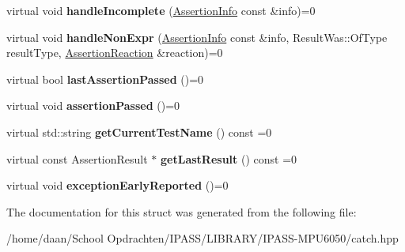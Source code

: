 \begin{DoxyCompactItemize}
\item 
\mbox{\label{structCatch_1_1IResultCapture_a89b89372eb09cc44f8dcad363de6157d}} 
virtual void {\bfseries handle\+Incomplete} (\hyperlink{structCatch_1_1AssertionInfo}{Assertion\+Info} const \&info)=0
\item 
\mbox{\label{structCatch_1_1IResultCapture_ab7dbdf8aa28427119583e24dbb302c63}} 
virtual void {\bfseries handle\+Non\+Expr} (\hyperlink{structCatch_1_1AssertionInfo}{Assertion\+Info} const \&info, Result\+Was\+::\+Of\+Type result\+Type, \hyperlink{structCatch_1_1AssertionReaction}{Assertion\+Reaction} \&reaction)=0
\item 
\mbox{\label{structCatch_1_1IResultCapture_a973435fbdcb2f6f07a0ec5719a01e956}} 
virtual bool {\bfseries last\+Assertion\+Passed} ()=0
\item 
\mbox{\label{structCatch_1_1IResultCapture_a9b0ef2cb071e9a9dc6ec1b533026aea7}} 
virtual void {\bfseries assertion\+Passed} ()=0
\item 
\mbox{\label{structCatch_1_1IResultCapture_aea1617f4a84cc648246aa3ed6918b5bf}} 
virtual std\+::string {\bfseries get\+Current\+Test\+Name} () const =0
\item 
\mbox{\label{structCatch_1_1IResultCapture_ab18872c89fab97405a56e9c6a4919736}} 
virtual const Assertion\+Result $\ast$ {\bfseries get\+Last\+Result} () const =0
\item 
\mbox{\label{structCatch_1_1IResultCapture_ae63ecec95db4c236c63ecf616f483810}} 
virtual void {\bfseries exception\+Early\+Reported} ()=0
\end{DoxyCompactItemize}


The documentation for this struct was generated from the following file\+:\begin{DoxyCompactItemize}
\item 
/home/daan/\+School Opdrachten/\+I\+P\+A\+S\+S/\+L\+I\+B\+R\+A\+R\+Y/\+I\+P\+A\+S\+S-\/\+M\+P\+U6050/catch.\+hpp\end{DoxyCompactItemize}
